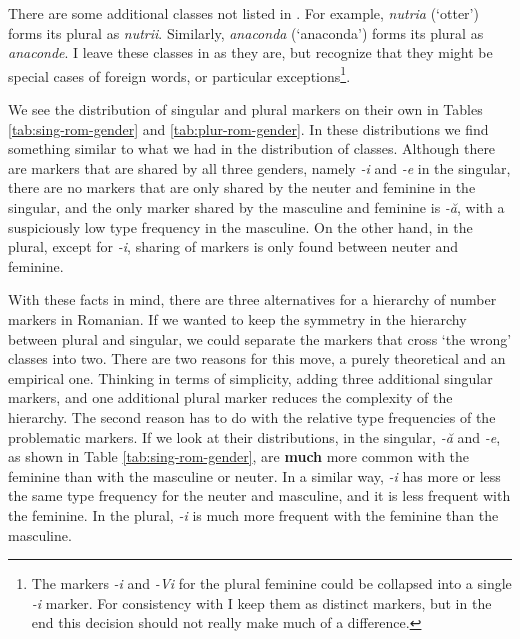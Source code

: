 There are some additional classes not listed in \textcite{Cojocaru.2003}. For example, \textit{nutria} (`otter') forms its plural as \textit{nutrii}. Similarly, \textit{anaconda} (`anaconda') forms its plural as \textit{anaconde}. I leave these classes in as they are, but recognize that they might be special cases of foreign words, or particular exceptions\footnote{The markers \textit{-i} and \textit{-Vi} for the plural feminine could be collapsed into a single \textit{-i} marker. For consistency with \textcite{Cojocaru.2003} I keep them as distinct markers, but in the end this decision should not really make much of a difference.}.

We see the distribution of singular and plural markers on their own in Tables \ref{tab:sing-rom-gender} and \ref{tab:plur-rom-gender}. In these distributions we find something similar to what we had in the distribution of classes. Although there are markers that are shared by all three genders, namely \textit{-i} and \textit{-e} in the singular, there are no markers that are only shared by the neuter and feminine in the singular, and the only marker shared by the masculine and feminine is \textit{-ă}, with a suspiciously low type frequency in the masculine. On the other hand, in the plural, except for \textit{-i}, sharing of markers is only found between neuter and feminine.

With these facts in mind, there are three alternatives for a hierarchy of number markers in Romanian. If we wanted to keep the symmetry in the hierarchy between plural and singular, we could separate the markers that cross `the wrong' classes into two. There are two reasons for this move, a purely theoretical and an empirical one. Thinking in terms of simplicity, adding three additional singular markers, and one additional plural marker reduces the complexity of the hierarchy. The second reason has to do with the relative type frequencies of the problematic markers. If we look at their distributions, in the singular, \textit{-ă} and \textit{-e}, as shown in Table \ref{tab:sing-rom-gender}, are \textbf{much} more common with the feminine than with the masculine or neuter. In a similar way, \textit{-i} has more or less the same type frequency for the neuter and masculine, and it is less frequent with the feminine. In the plural, \textit{-i} is much more frequent with the feminine than the masculine.

